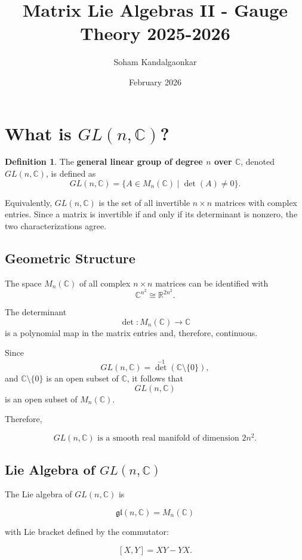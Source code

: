 \documentclass{article}
\title{Matrix Lie Algebras II - Gauge Theory 2025-2026}
\author{Soham Kandalgaonkar}
\date{February 2026}
\theoremstyle{definition}
\newtheorem{definition}{Definition}[section]
\begin{document}
\maketitle

\section{What is $GL(n,\mathbb{C})$?}

\begin{definition}
The \textbf{general linear group of degree $n$ over $\mathbb{C}$}, denoted $GL(n,\mathbb{C})$, is defined as
\[
GL(n,\mathbb{C}) = \{ A \in M_n(\mathbb{C}) \mid \det(A) \neq 0 \}.
\]
\end{definition}

Equivalently, $GL(n,\mathbb{C})$ is the set of all invertible $n \times n$ matrices with complex entries. Since a matrix is invertible if and only if its determinant is nonzero, the two characterizations agree.


\subsection*{Geometric Structure}

The space $M_n(\mathbb{C})$ of all complex $n \times n$ matrices can be identified with
\[
\mathbb{C}^{n^2} \cong \mathbb{R}^{2n^2}.
\]

The determinant
\[
\det : M_n(\mathbb{C}) \to \mathbb{C}
\]
is a polynomial map in the matrix entries and, therefore, continuous.

Since
\[
GL(n,\mathbb{C}) = \det^{-1}(\mathbb{C} \setminus \{0\}),
\]
and $\mathbb{C} \setminus \{0\}$ is an open subset of $\mathbb{C}$, it follows that
\[
GL(n,\mathbb{C})
\]
is an open subset of $M_n(\mathbb{C})$.


Therefore,

\[
GL(n,\mathbb{C})
\text{ is a smooth real manifold of dimension } 2n^2.
\]

\subsection*{Lie Algebra of $GL(n,\mathbb{C})$}

The Lie algebra of $GL(n,\mathbb{C})$ is

\[
\mathfrak{gl}(n,\mathbb{C}) = M_n(\mathbb{C})
\]

with Lie bracket defined by the commutator:

\[
[X,Y] = XY - YX.
\]
\end{document}
